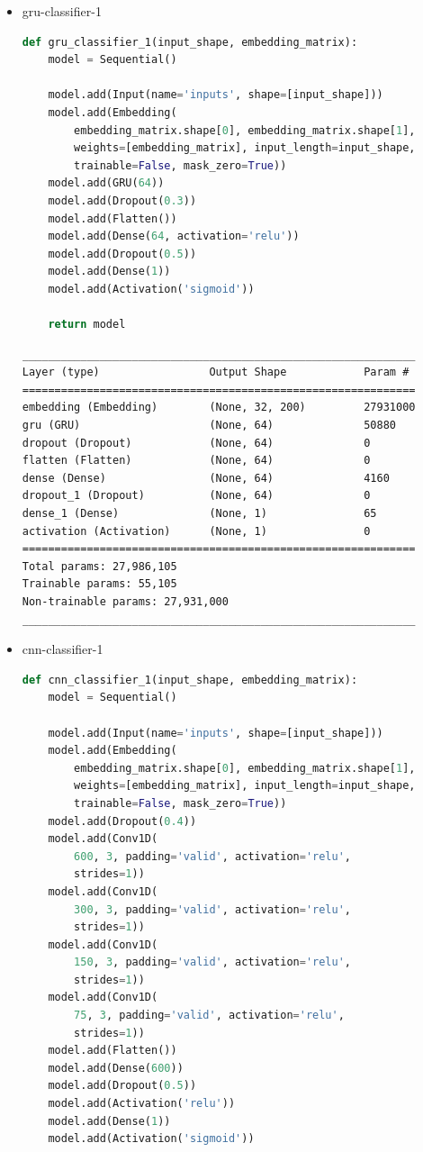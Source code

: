 \documentclass{article}
\begin{document}
\begin{itemize}
  \item gru-classifier-1

\begin{lstlisting}[language=Python, caption=Дефиниция на gru-classifier-1.]
def gru_classifier_1(input_shape, embedding_matrix):
    model = Sequential()

    model.add(Input(name='inputs', shape=[input_shape]))
    model.add(Embedding(
        embedding_matrix.shape[0], embedding_matrix.shape[1],
        weights=[embedding_matrix], input_length=input_shape,
        trainable=False, mask_zero=True))
    model.add(GRU(64))
    model.add(Dropout(0.3))
    model.add(Flatten())
    model.add(Dense(64, activation='relu'))
    model.add(Dropout(0.5))
    model.add(Dense(1))
    model.add(Activation('sigmoid'))

    return model
\end{lstlisting}

\begin{lstlisting}[numbers=none, caption=Обобщение на gru-classifier-1.]
_____________________________________________________________
Layer (type)                 Output Shape            Param #
=============================================================
embedding (Embedding)        (None, 32, 200)         27931000
gru (GRU)                    (None, 64)              50880
dropout (Dropout)            (None, 64)              0
flatten (Flatten)            (None, 64)              0
dense (Dense)                (None, 64)              4160
dropout_1 (Dropout)          (None, 64)              0
dense_1 (Dense)              (None, 1)               65
activation (Activation)      (None, 1)               0
=============================================================
Total params: 27,986,105
Trainable params: 55,105
Non-trainable params: 27,931,000
_____________________________________________________________
\end{lstlisting}

  \item cnn-classifier-1

\begin{lstlisting}[language=Python, caption=Дефиниция на cnn-classifier-1.]
def cnn_classifier_1(input_shape, embedding_matrix):
    model = Sequential()

    model.add(Input(name='inputs', shape=[input_shape]))
    model.add(Embedding(
        embedding_matrix.shape[0], embedding_matrix.shape[1],
        weights=[embedding_matrix], input_length=input_shape,
        trainable=False, mask_zero=True))
    model.add(Dropout(0.4))
    model.add(Conv1D(
        600, 3, padding='valid', activation='relu',
        strides=1))
    model.add(Conv1D(
        300, 3, padding='valid', activation='relu',
        strides=1))
    model.add(Conv1D(
        150, 3, padding='valid', activation='relu',
        strides=1))
    model.add(Conv1D(
        75, 3, padding='valid', activation='relu',
        strides=1))
    model.add(Flatten())
    model.add(Dense(600))
    model.add(Dropout(0.5))
    model.add(Activation('relu'))
    model.add(Dense(1))
    model.add(Activation('sigmoid'))


\end{lstlisting}
\end{itemize}
\end{document}
